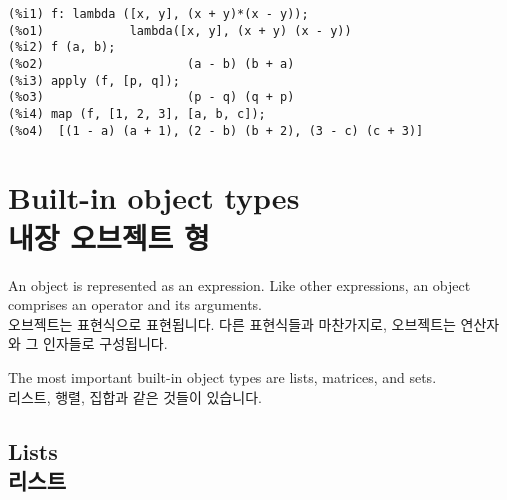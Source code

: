 \documentclass[12pt]{article}
\begin{document}
\begin{enumerate}
\begin{verbatim}
(%i1) f: lambda ([x, y], (x + y)*(x - y));
(%o1)            lambda([x, y], (x + y) (x - y))
(%i2) f (a, b);
(%o2)                    (a - b) (b + a)
(%i3) apply (f, [p, q]);
(%o3)                    (p - q) (q + p)
(%i4) map (f, [1, 2, 3], [a, b, c]);
(%o4)  [(1 - a) (a + 1), (2 - b) (b + 2), (3 - c) (c + 3)]
\end{verbatim}

\end{enumerate}

\section{Built-in object types \\ 내장 오브젝트 형}

An object is represented as an expression.
Like other expressions, an object comprises an operator and its arguments. \\

오브젝트는 표현식으로 표현됩니다.
다른 표현식들과 마찬가지로, 오브젝트는 연산자와 그 인자들로 구성됩니다.

The most important built-in object types are lists, matrices, and sets. \\

리스트, 행렬, 집합과 같은 것들이 있습니다.

\subsection{Lists \\ 리스트}
\end{document}
